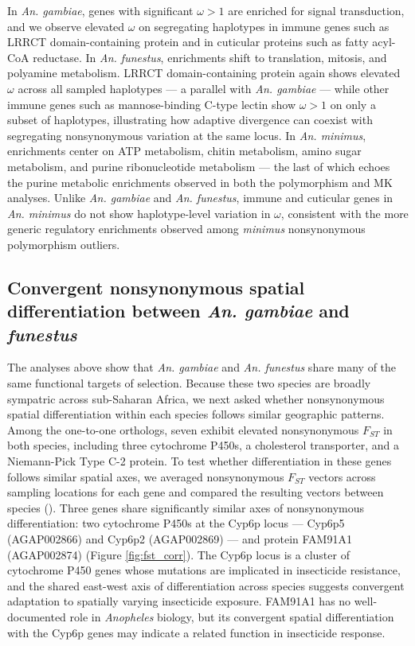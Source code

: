 In \textit{An. gambiae}, genes with significant $\omega > 1$
are enriched for signal transduction,
and we observe elevated $\omega$ on segregating haplotypes
in immune genes such as LRRCT domain-containing protein
and in cuticular proteins such as fatty acyl-CoA reductase.
In \textit{An. funestus}, enrichments shift to translation,
mitosis, and polyamine metabolism.
LRRCT domain-containing protein again shows elevated $\omega$
across all sampled haplotypes --- a parallel with \textit{An. gambiae} ---
while other immune genes such as mannose-binding C-type lectin
show $\omega > 1$ on only a subset of haplotypes,
illustrating how adaptive divergence can coexist
with segregating nonsynonymous variation at the same locus.
In \textit{An. minimus}, enrichments center on ATP metabolism,
chitin metabolism, amino sugar metabolism,
and purine ribonucleotide metabolism ---
the last of which echoes the purine metabolic enrichments
observed in both the polymorphism and MK analyses.
Unlike \textit{An. gambiae} and \textit{An. funestus},
immune and cuticular genes in \textit{An. minimus}
do not show haplotype-level variation in $\omega$,
consistent with the more generic regulatory enrichments
observed among \textit{minimus} nonsynonymous polymorphism outliers.

\subsection{Convergent nonsynonymous spatial differentiation between \textit{An. gambiae} and \textit{funestus}}

The analyses above show that \textit{An. gambiae} and \textit{An. funestus}
share many of the same functional targets of selection.
Because these two species are broadly sympatric across sub-Saharan Africa,
we next asked whether nonsynonymous spatial differentiation
within each species follows similar geographic patterns.
Among the one-to-one orthologs,
seven exhibit elevated nonsynonymous $F_{ST}$ in both species,
including three cytochrome P450s, a cholesterol transporter,
and a Niemann-Pick Type C-2 protein.
To test whether differentiation in these genes follows similar spatial axes,
we averaged nonsynonymous $F_{ST}$ vectors across sampling locations
for each gene and compared the resulting vectors between species
().
Three genes share significantly similar axes of nonsynonymous differentiation:
two cytochrome P450s at the Cyp6p locus ---
Cyp6p5 (AGAP002866) and Cyp6p2 (AGAP002869) ---
and protein FAM91A1 (AGAP002874) (Figure \ref{fig:fst_corr}).
The Cyp6p locus is a cluster of cytochrome P450 genes
whose mutations are implicated in insecticide resistance,
and the shared east-west axis of differentiation across species
suggests convergent adaptation to spatially varying insecticide exposure.
FAM91A1 has no well-documented role in \textit{Anopheles} biology,
but its convergent spatial differentiation with the Cyp6p genes
may indicate a related function in insecticide response.

